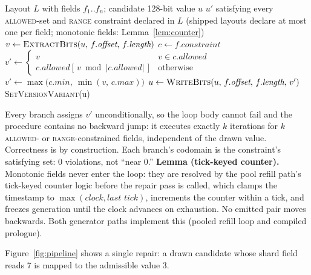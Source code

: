 \documentclass{svproc}
\begin{document}
\begin{algorithm}[!ht]
\caption{Single-pass constraint satisfaction}
\label{alg:repair}
\begin{algorithmic}[1]
\Require Layout $L$ with fields $f_1..f_n$; candidate 128-bit value $u$
\Ensure  $u'$ satisfying every \textsc{allowed}-set and \textsc{range} constraint declared in $L$ (shipped layouts declare at most one per field; monotonic fields: Lemma~\ref{lem:counter})
\Statex
{}
  \State $v \gets \textsc{ExtractBits}(u,\, f.\textit{offset},\, f.\textit{length})$
  \State $c \gets f.\textit{constraint}$
    \State $v' \gets
           \begin{cases}
             v & v \in c.\textit{allowed} \\
             c.\textit{allowed}[\,v \bmod |c.\textit{allowed}|\,] & \text{otherwise}
           \end{cases}$
    \State $v' \gets \max\bigl(c.\textit{min},\ \min(v,\, c.\textit{max})\bigr)$
  \EndIf
  \State $u \gets \textsc{WriteBits}(u,\, f.\textit{offset},\,
          f.\textit{length},\, v')$
\EndFor
\State \Return \textsc{SetVersionVariant}(u)
\end{algorithmic}
\end{algorithm}

Every branch assigns $v'$ unconditionally, so the loop body cannot fail and the procedure contains no backward jump: it executes exactly $k$ iterations for $k$ \textsc{allowed}- or \textsc{range}-constrained fields, independent of the drawn value. Correctness is by construction. Each branch's codomain is the constraint's satisfying set: 0 violations, not ``near 0.'' \textbf{Lemma (tick-keyed counter).}\label{lem:counter} Monotonic fields never enter the loop: they are resolved by the pool refill path's tick-keyed counter logic before the repair pass is called, which clamps the timestamp to $\max(\textit{clock}, \textit{last tick})$, increments the counter within a tick, and freezes generation until the clock advances on exhaustion. No emitted pair moves backwards. Both generator paths implement this (pooled refill loop and compiled prologue).

Figure~\ref{fig:pipeline} shows a single repair: a drawn candidate whose shard field reads 7 is mapped to the admissible value 3.
\end{document}
